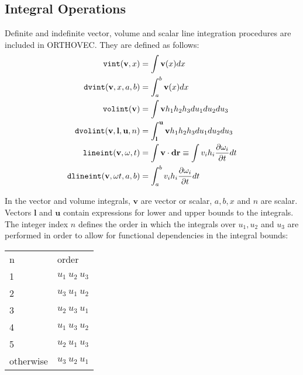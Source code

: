 \subsection{Integral Operations}
Definite and indefinite vector, volume and scalar line integration
procedures are included in \textsc{ORTHOVEC}.  They are defined as follows:
 
 
 
\hypertarget{operator:VINT}{}
\hypertarget{operator:DVINT}{}
\hypertarget{operator:VOLINT}{}
\hypertarget{operator:DVOLINT}{}
\hypertarget{operator:LINEINT_OV}{}
\hypertarget{operator:DLINEINT}{}
\begin{align*}
\f{vint} (\mathbf{v},x) & =  \int \mathbf{v}(x)dx\\
%
\f{dvint} (\mathbf{v},x, a, b) & =  \int^b_a \mathbf{v} (x) dx\\
%
\f{volint} (\mathbf{v}) & =  \int \mathbf{v} h_1 h_2 h_3 du_1 du_2 du_3\\
%
\f{dvolint}(\mathbf{v},\mathbf{l},\mathbf{u},n) & = \int^\mathbf{u}_\mathbf{l}
\mathbf{v} h_1 h_2 h_3 du_1 du_2 du_3\\
%
\f{lineint} (\mathbf{v, \omega}, t) & =  \int \mathbf{v} \cdot \mathbf{dr}
\equiv \int v_i h_i \frac{\partial \omega_i}{\partial t} dt\\
%
\f{dlineint} (\mathbf{v, \omega} t, a, b) & = \int^b_a v_i h_i
\frac{\partial \omega_i}{\partial t} dt
\end{align*}

In the vector and volume integrals, $\mathbf{v}$ are vector or scalar,
$a, b,x$ and $n$ are scalar.  Vectors $\mathbf{l}$ and $\mathbf{u}$ contain
expressions for lower and upper bounds to the integrals.  The integer
index $n$ defines the order in which the integrals over $u_1, u_2$ and
$u_3$ are performed in order to allow for functional dependencies in
the integral bounds:

\begin{center} 
\begin{tabular}{ll}
n & order\\ 1 & $u_1~u_2~u_3$\\
%
2 & $u_3~u_1~u_2$\\
%
3 & $u_2~u_3~u_1$\\
%
4 & $u_1~u_3~u_2$\\
%
5 & $u_2~u_1~u_3$\\ otherwise & $u_3~u_2~u_1$\\
\end{tabular}
\end{center}


